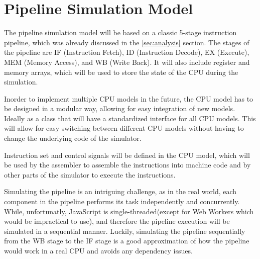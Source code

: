 \section{Pipeline Simulation Model}
The pipeline simulation model will be based on a classic 5-stage instruction pipeline, which was already discussed in the \ref{sec:analysis} section. The stages of the pipeline are IF (Instruction Fetch), ID (Instruction Decode), EX (Execute), MEM (Memory Access), and WB (Write Back). It will also include register and memory arrays, which will be used to store the state of the CPU during the simulation.

Inorder to implement multiple CPU models in the future, the CPU model has to be designed in a modular way, allowing for easy integration of new models. Ideally as a class that will have a standardized interface for all CPU models. This will allow for easy switching between different CPU models without having to change the underlying code of the simulator. 

Instruction set and control signals will be defined in the CPU model, which will be used by the assembler to assemble the instructions into machine code and by other parts of the simulator to execute the instructions.

Simulating the pipeline is an intriguing challenge, as in the real world, each component in the pipeline performs its task independently and concurrently. While, unfortunatly, JavaScript is single-threaded(except for Web Workers which would be impractical to use), and therefore the pipeline execution will be simulated in a sequential manner. Luckily, simulating the pipeline sequentially from the WB stage to the IF stage is a good approximation of how the pipeline would work in a real CPU and avoids any dependency issues. 

